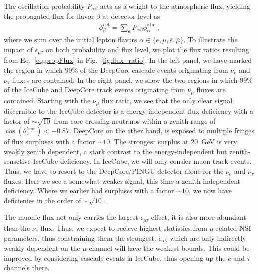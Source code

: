 \documentclass[draft=True]{revtex4-2}
\newcommand{\ztrue}{\ensuremath{\cos{(\theta_z^{true})}}}
\newcommand{\emt}{\ensuremath{\epsilon_{\mu\tau}}}
\renewcommand{\ne}{\nu_e}
\newcommand{\nm}{\nu_\mu}
\newcommand{\nt}{\nu_\tau}
\begin{document}
The oscillation probability $P_{\alpha \beta}$ acts as a weight to the atmospheric flux, yielding the propagated flux for flavor $\beta$ at detector level as 
\begin{align}\label{eq:propFlux}
    \phi_\beta^\text{det} = \sum_\alpha P_{\alpha\beta} \phi_\alpha^\text{atm} \,,
\end{align}
where we sum over the initial lepton flavors $\alpha \in \{e,\mu, \bar{e}, \bar{\mu}\}$. To illustrate the impact of $\emt$ on both probability
and flux level, we plot the flux ratios resulting from Eq.~\ref{eq:propFlux} in Fig.~\ref{fig:flux_ratio}. In the left panel, we have marked the region in which 99\% of the 
DeepCore cascade events originating from $\ne$ and $\nt$ fluxes are contained. In the right panel, we show the two regions in which 99\% of the IceCube 
and DeepCore track events originating from $\nm$ fluxes are contained. Starting with the $\nm$ flux ratio, we see that the only clear signal discernible to the IceCube detector
is a energy-independent flux deficiency with a factor of $\sim \sqrt{10}$ from core-crossing neutrinos within a zenith range of $\ztrue < -0.87$. DeepCore on the other hand, 
is exposed to multiple fringes of flux surpluses with a factor $\sim 10$. The strongest surplus at \SI{20}{\GeV} is very weakly zenith dependent, a stark contrast to the
energy-independent but zenith-sensetive IceCube deficiency.
In IceCube, we will only consier muon track events. Thus, we have to resort to the DeepCore/PINGU detector alone for the $\nu_e$ and $\nu_\tau$ fluxes.
Here we see a somewhat weaker signal, this time a zenith-independent deficiency. Where we earlier had surpluses with a factor $\sim 10$, we now have deficienies in the order of $\sim \sqrt{10}$.

The muonic flux not only carries the largest $\emt$ effect, it is also more abundant than the $\ne$ flux. Thus, we expect to recieve highest statistics from $\mu$-related NSI parameters,
thus constraining them the strongest. $\epsilon_{\alpha\beta}$ which are only indirectly weakly dependent on the $\mu$ channel will have the weakest bounds. This could be improved
by considering cascade events in IceCube, thus opening up the $e$ and $\tau$ channels there.
\end{document}
